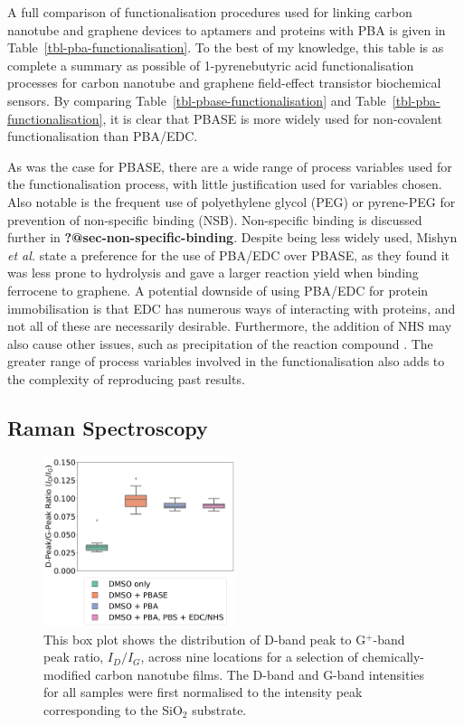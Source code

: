 \documentclass[
  a4paper,
]{scrbook}
\begin{document}
A full comparison of functionalisation procedures used for linking
carbon nanotube and graphene devices to aptamers and proteins with PBA
is given in Table~\ref{tbl-pba-functionalisation}. To the best of my
knowledge, this table is as complete a summary as possible of
1-pyrenebutyric acid functionalisation processes for carbon nanotube and
graphene field-effect transistor biochemical sensors. By comparing
Table~\ref{tbl-pbase-functionalisation} and
Table~\ref{tbl-pba-functionalisation}, it is clear that PBASE is more
widely used for non-covalent functionalisation than PBA/EDC.

As was the case for PBASE, there are a wide range of process variables
used for the functionalisation process, with little justification used
for variables chosen. Also notable is the frequent use of polyethylene
glycol (PEG) or pyrene-PEG for prevention of non-specific binding (NSB).
Non-specific binding is discussed further in
\textbf{?@sec-non-specific-binding}. Despite being less widely used,
Mishyn \emph{et al.} \autocite{Mishyn2022} state a preference for the
use of PBA/EDC over PBASE, as they found it was less prone to hydrolysis
and gave a larger reaction yield when binding ferrocene to graphene. A
potential downside of using PBA/EDC for protein immobilisation is that
EDC has numerous ways of interacting with proteins, and not all of these
are necessarily desirable. Furthermore, the addition of NHS may also
cause other issues, such as precipitation of the reaction compound
\autocite{Hermanson2013-4}. The greater range of process variables
involved in the functionalisation also adds to the complexity of
reproducing past results.

\hypertarget{raman-spectroscopy}{%
\subsection{Raman Spectroscopy}\label{raman-spectroscopy}}

\begin{figure}

{\centering \includegraphics[width=0.5\textwidth,height=\textheight]{figures/ch6/comparison_raman.png}

}

\caption{\label{fig-linker-raman}This box plot shows the distribution of
D-band peak to G\(^+\)-band peak ratio, \(I_D/I_G\), across nine
locations for a selection of chemically-modified carbon nanotube films.
The D-band and G-band intensities for all samples were first normalised
to the intensity peak corresponding to the SiO\(_2\) substrate.}

\end{figure}
\end{document}

